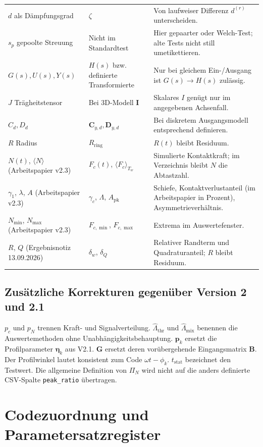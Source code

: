 \documentclass[11pt,a4paper]{article}
\begin{document}
\begin{longtable}{@{}L{.27\textwidth}L{.28\textwidth}L{.40\textwidth}@{}}
$d$ als Dämpfungsgrad&$\zeta$&Von laufweiser Differenz $d^{(r)}$ unterscheiden.\\
$s_p$ gepoolte Streuung&Nicht im Standardtest&Hier gepaarter oder Welch-Test; alte Tests nicht still umetikettieren.\\
$G(s),U(s),Y(s)$&$H(s)$ bzw. definierte Transformierte&Nur bei gleichem Ein-/Ausgang ist $G(s)\to H(s)$ zulässig.\\
$J$ Trägheitstensor&Bei 3D-Modell $\mathbf I$&Skalares $I$ genügt nur im angegebenen Achsenfall.\\
$C_d,D_d$&$\mathbf C_{y,d},\mathbf D_{y,d}$&Bei diskretem Ausgangsmodell entsprechend definieren.\\
$R$ Radius&$R_{\mathrm{ring}}$&$R(t)$ bleibt Residuum.\\
$N(t)$, $\langle N\rangle$ (Arbeitspapier v2.3)&$F_c(t)$, $\langle F_c\rangle_{T_w}$&Simulierte Kontaktkraft; im Verzeichnis bleibt $N$ die Abtastzahl.\\
$\gamma_1$, $\lambda$, $A$ (Arbeitspapier v2.3)&$\gamma_c$, $\Lambda$, $A_{\mathrm{pk}}$&Schiefe, Kontaktverlustanteil (im Arbeitspapier in Prozent), Asymmetrieverhältnis.\\
$N_{\min}$, $N_{\max}$ (Arbeitspapier v2.3)&$F_{c,\min}$, $F_{c,\max}$&Extrema im Auswertefenster.\\
$R$, $Q$ (Ergebnisnotiz 13.09.2026)&$\delta_w$, $\delta_Q$&Relativer Randterm und Quadraturanteil; $R$ bleibt Residuum.\\
\bottomrule\end{longtable}
\subsection{Zusätzliche Korrekturen gegenüber Version 2 und 2.1}
$p_c$ und $p_N$ trennen Kraft- und Signalverteilung. $\hat\Lambda_{\mathrm{thr}}$ und $\hat\Lambda_{\mathrm{mix}}$ benennen die Auswertemethoden ohne Unabhängigkeitsbehauptung. $\mathbf p_k$ ersetzt die Profilparameter $\boldsymbol\eta_k$ aus V2.1. $\mathbf G$ ersetzt deren vorübergehende Eingangsmatrix $\mathbf B$. Der Profilwinkel lautet konsistent zum Code $\omega t-\phi_k$. $t_{\mathrm{stat}}$ bezeichnet den Testwert. Die allgemeine Definition von $\Pi_N$ wird nicht auf die anders definierte CSV-Spalte \texttt{peak\_ratio} übertragen.

\section{Codezuordnung und Parametersatzregister}\label{app:code}
\end{document}
